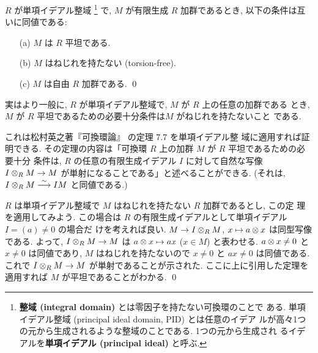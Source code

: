 \documentclass[12pt,twoside]{jarticle}
\begin{document}
\begin{question}
  $R$ が単項イデアル整域%
  \footnote{{\bf 整域 (integral domain)} とは零因子を持たない可換環のことで
    ある.  {単項イデアル整域 (principal ideal domain, PID)} とは任意のイデア
    ルが高々1つの元から生成されるような整域のことである. 1つの元から生成され
    るイデアルを{\bf 単項イデアル (principal ideal)} と呼ぶ.}%
  で, $M$ が有限生成 $R$ 加群であるとき, 以下の条件は互いに同値である:
  \begin{itemize}
  \item[(a)] $M$ は $R$ 平坦である.
  \item[(b)] $M$ はねじれを持たない (torsion-free).
  \item[(c)] $M$ は自由 $R$ 加群である. \qed
  \end{itemize}
\end{question}

\begin{guide}
  実はより一般に, $R$ が単項イデアル整域で, $M$ が $R$ 上の任意の加群である
  とき, $M$ が $R$ 平坦であるための必要十分条件は$M$ がねじれを持たないこと
  である.

  これは松村英之著『可換環論』 \cite{matsumura} の定理 7.7 を単項イデアル整
  域に適用すれば証明できる.  
  その定理の内容は「可換環 $R$ 上の加群 $M$ が $R$ 平坦であるための必要十分
  条件は, $R$ の任意の有限生成イデアル $I$ に対して自然な写像 $I\otimes_R M\to M$
  が単射になることである」と述べることができる. (それは, $I\otimes_R M\overset\sim\longrightarrow IM$
  と同値である.)

  $R$ は単項イデアル整域で $M$ はねじれを持たない $R$ 加群であるとし, この定
  理を適用してみよう.  
  この場合は $R$ の有限生成イデアルとして単項イデアル $I=(a)\ne 0$ の場合だ
  けを考えれば良い. 
  $M\to I\otimes_R M$, $x\mapsto a\otimes x$ は同型写像である.
  よって, $I\otimes_R M\to M$ は $a\otimes x\mapsto ax$ ($x\in M$) と表わせる. 
  $a\otimes x \ne 0$ と $x\ne 0$ は同値であり, 
  $M$ はねじれを持たないので $x\ne 0$ と $ax\ne 0$ は同値である.
  これで $I\otimes_R M\to M$ が単射であることが示された.
  ここに上に引用した定理を適用すれば $M$ が平坦であることがわかる. 
  \qed
\end{guide}
\end{document}

